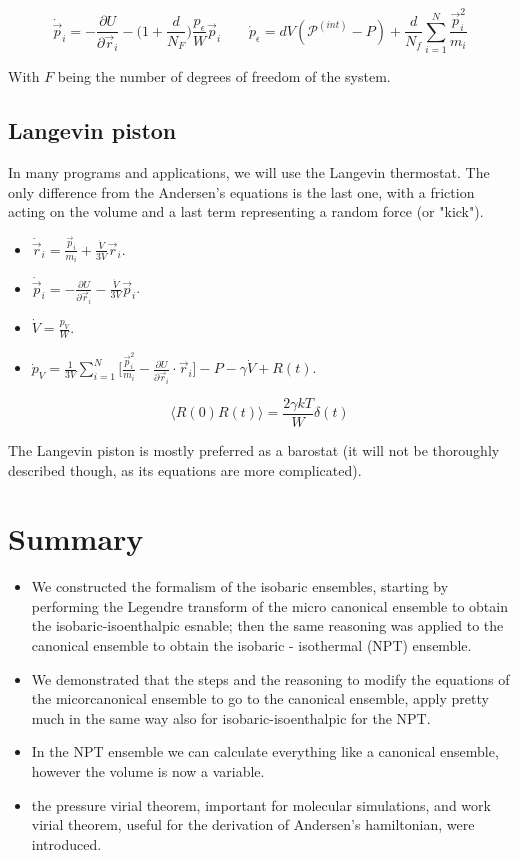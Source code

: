 $$\dot{\vec{p}}_i = -\frac{\partial U}{\partial\vec{r}_i} - \biggl(1+\frac{d}{N_F}\biggr)\frac{p_\epsilon}{W}\vec{p}_i\qquad \dot{p}_\epsilon = dV(\mathcal{P}^{(int)}-P) + \frac{d}{N_f}\sum\limits_{i=1}^N\frac{\vec{p}_i^2}{m_i}$$

With $F$ being the number of degrees of freedom of the system.

	\subsection{Langevin piston}
	In many programs and applications, we will use the Langevin thermostat.
	The only difference from the Andersen's equations is the last one, with a friction acting on the volume and a last term representing a random force (or "kick").

	\begin{itemize}
		\item $\dot{\vec{r}}_i = \frac{\vec{p}_i}{m_i} + \frac{\dot{V}}{3V}\vec{r}_i$.
		\item $\dot{\vec{p}}_i = -\frac{\partial U}{\partial\vec{r}_i}-\frac{\dot{V}}{3V}\vec{p}_i$.
		\item $\dot{V} = \frac{p_V}{W}$.
		\item $\dot{p}_V = \frac{1}{3V}\sum\limits_{i=1}^N\biggl[\frac{\vec{p}_i^2}{m_i}-\frac{\partial U}{\partial\vec{r}_i}\cdot\vec{r}_i\biggr]-P-\gamma\dot{V}+R(t)$.
	\end{itemize}

	$$\langle R(0)R(t)\rangle = \frac{2\gamma kT}{W}\delta(t)$$

	The Langevin piston is mostly preferred as a barostat (it will not be thoroughly described though, as its equations are more complicated).

\section{Summary}
\begin{itemize}
\item We constructed the formalism of the isobaric ensembles, starting by performing the Legendre transform of the micro canonical ensemble to obtain the isobaric-isoenthalpic esnable; then the same reasoning was applied to the canonical ensemble to obtain the isobaric - isothermal (NPT) ensemble.
\item We demonstrated that the steps and the reasoning to modify the equations of the micorcanonical ensemble to go to the canonical ensemble, apply pretty much in the same way also for isobaric-isoenthalpic for the NPT.
\item In the NPT ensemble we can calculate everything like a canonical ensemble, however the volume is now a variable.
\item the pressure virial theorem, important for molecular simulations, and work virial theorem, useful for the derivation of Andersen's hamiltonian, were introduced.
\end{itemize}

